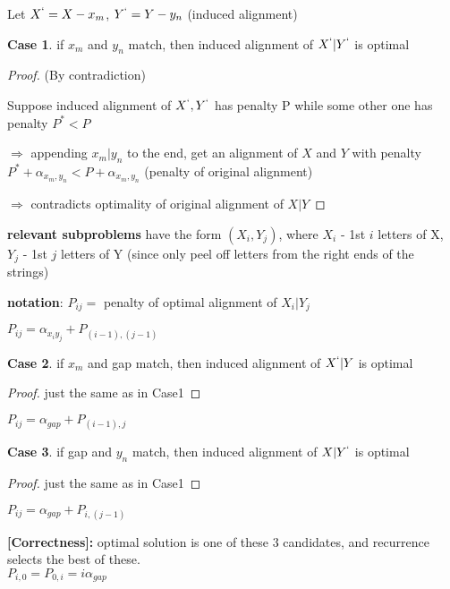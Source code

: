 \documentclass[a4paper,12pt]{article}
\theoremstyle{plain}
\theoremstyle{definition}
\newtheorem{case}{Case}[subsection]
\theoremstyle{remark}
\begin{document}
Let $X^` = X - x_m$, $Y^` = Y - y_n$ (induced alignment)

\begin{case}
if $x_m$ and $y_n$ match, then induced alignment of $X^` | Y^`$ is optimal

\begin{proof}
(By contradiction)

Suppose induced alignment of $X^`, Y^`$ has penalty P while some other one has penalty $P^* < P$

$\Rightarrow$ appending $x_m | y_n$ to the end, get an alignment of $X$ and $Y$ with penalty $P^* + \alpha_{x_m,y_n} < P + \alpha_{x_m,y_n}$ (penalty of original alignment)

$\Rightarrow$ contradicts optimality of original alignment of $X | Y$
\end{proof}

\textbf{relevant subproblems} have the form $(X_i, Y_j)$, where $X_i$ - 1st $i$ letters of X, $Y_j$ - 1st $j$ letters of Y (since only peel off letters from the right ends of the strings)

\textbf{notation}: $P_{ij} =$ penalty of optimal alignment of $X_i | Y_j$

$P_{ij} = \alpha_{x_i y_j} + P_{(i-1), (j-1)}$
\end{case}

\begin{case}
if $x_m$ and gap match, then induced alignment of $X^` | Y$ is optimal
\begin{proof}
just the same as in Case1
\end{proof}

$P_{ij} = \alpha_{gap} + P_{(i-1), j}$
\end{case}

\begin{case}
if gap and $y_n$ match, then induced alignment of $X | Y^`$ is optimal
\begin{proof}
just the same as in Case1
\end{proof}
$P_{ij} = \alpha_{gap} + P_{i, (j-1)}$
\end{case}

\textbf{[Correctness]:} optimal solution is one of these $3$ candidates, and recurrence selects the best of these.
\\

$P_{i,0} = P_{0,i} = i \alpha_{gap}$
\\
\end{document}
